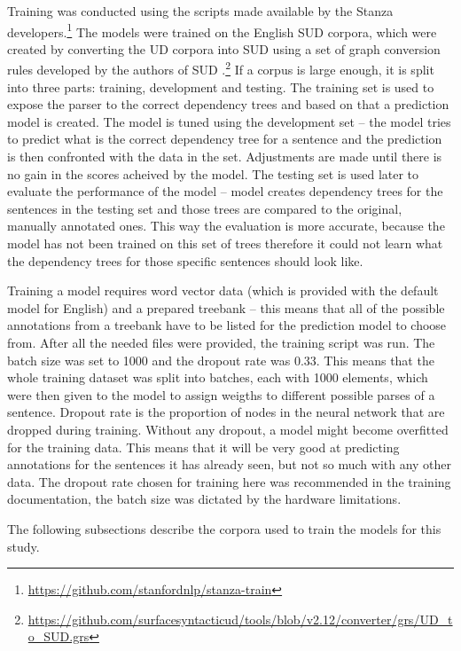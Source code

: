 Training was conducted using the scripts made available by the Stanza developers.\footnote{\url{https://github.com/stanfordnlp/stanza-train}} The models were trained on the English SUD corpora, which were created by converting the UD corpora into SUD using a set of graph conversion rules developed by the authors of SUD \citep{gerdes-etal-2018-sud}.\footnote{\url{https://github.com/surfacesyntacticud/tools/blob/v2.12/converter/grs/UD_to_SUD.grs}} If a corpus is large enough, it is split into three parts: training, development and testing. The training set is used to expose the parser to the correct dependency trees and based on that a prediction model is created. The model is tuned using the development set -- the model tries to predict what is the correct dependency tree for a sentence and the prediction is then confronted with the data in the set. Adjustments are made until there is no gain in the scores acheived by the model. The testing set is used later to evaluate the performance of the model -- model creates dependency trees for the sentences in the testing set and those trees are compared to the original, manually annotated ones. This way the evaluation is more accurate, because the model has not been trained on this set of trees therefore it could not learn what the dependency trees for those specific sentences should look like.

Training a model requires word vector data (which is provided with the default model for English) and a prepared treebank -- this means that all of the possible annotations from a treebank have to be listed for the prediction model to choose from. After all the needed files were provided, the training script was run. The batch size was set to 1000 and the dropout rate was 0.33. This means that the whole training dataset was split into batches, each with 1000 elements, which were then given to the model to assign weigths to different possible parses of a sentence. Dropout rate is the proportion of nodes in the neural network that are dropped during training. Without any dropout, a model might become overfitted for the training data. This means that it will be very good at predicting annotations for the sentences it has already seen, but not so much with any other data. The dropout rate chosen for training here was recommended in the training documentation, the batch size was dictated by the hardware limitations.

The following subsections describe the corpora used to train the models for this study.

